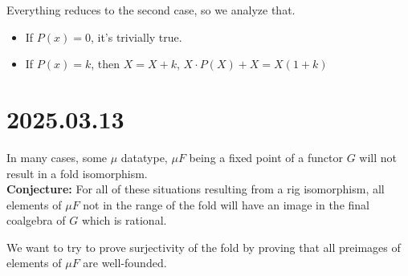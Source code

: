 \documentclass[letterpaper,numbers=enddot]{scrartcl}
\begin{document}
Everything reduces to the second case, so we analyze that.
\begin{itemize}
  \item If $P(x)=0$, it's trivially true.
  \item If $P(x) = k$, then $X = X + k$, $X \cdot P(X) + X = X (1 + k)$
\end{itemize}

\section{2025.03.13}

In many cases, some $\mu$ datatype, $\mu F$ being a fixed point of a functor $G$ will not result in a fold isomorphism. \\ 
\textbf{Conjecture: } For all of these situations resulting from a rig isomorphism, all elements of $\mu F$ not in the range of the fold will have an image in the final coalgebra of $G$ which is rational.

We want to try to prove surjectivity of the fold by proving that all preimages of elements of $\mu F$ are well-founded.
\end{document}
